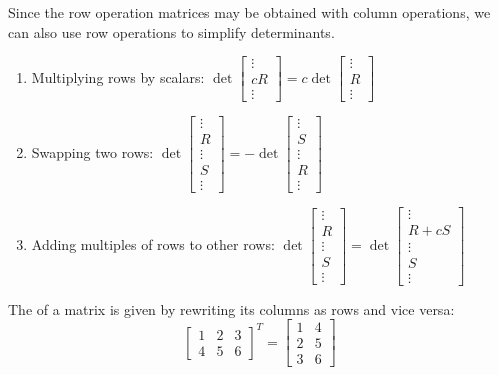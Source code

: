 \begin{applicationActivities}

\begin{fact}
Since the row operation matrices may be obtained with column operations,
we can also use row operations to simplify determinants.
\begin{enumerate}
\item Multiplying rows by scalars:
  \(\det\begin{bmatrix}\vdots\\cR\\\vdots\end{bmatrix}=
  c\det\begin{bmatrix}\vdots\\R\\\vdots\end{bmatrix}\)
\item Swapping two rows:
  \(\det\begin{bmatrix}\vdots\\R\\\vdots\\S\\\vdots\end{bmatrix}=
  -\det\begin{bmatrix}\vdots\\S\\\vdots\\R\\\vdots\end{bmatrix}\)
\item Adding multiples of rows to other rows:
  \(\det\begin{bmatrix}\vdots\\R\\\vdots\\S\\\vdots\end{bmatrix}=
  \det\begin{bmatrix}\vdots\\R+cS\\\vdots\\S\\\vdots\end{bmatrix}\)
\end{enumerate}
\end{fact}

\begin{definition}
  The  of a matrix is given by rewriting its columns as
  rows and vice versa:
  \[
    \begin{bmatrix}
      1 & 2 & 3 \\
      4 & 5 & 6
    \end{bmatrix}^T
  =
    \begin{bmatrix}
      1 & 4  \\
      2 & 5  \\
      3 & 6
    \end{bmatrix}
  \]
\end{definition}


\end{applicationActivities}

